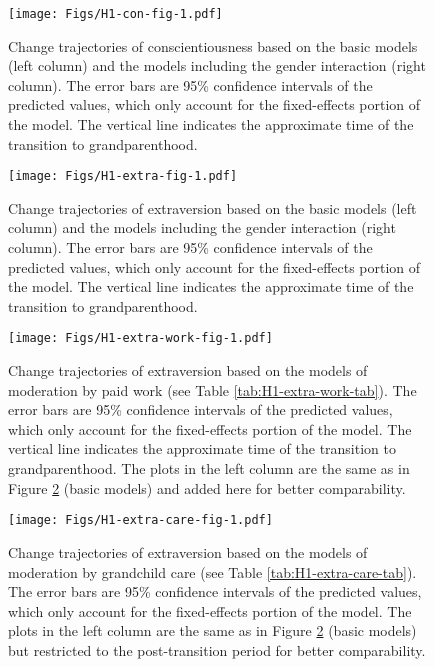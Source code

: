 \documentclass[
  english,
  man,floatsintext]{apa7}
\begin{document}
\begin{figure}
\centering
\texttt{[image: Figs/H1-con-fig-1.pdf]}
\caption{\label{fig:H1-con-fig}Change trajectories of conscientiousness based on the basic models (left column) and the models including the gender interaction (right column). The error bars are 95\% confidence intervals of the predicted values, which only account for the fixed-effects portion of the model. The vertical line indicates the approximate time of the transition to grandparenthood.}
\end{figure}



\begin{figure}
\centering
\texttt{[image: Figs/H1-extra-fig-1.pdf]}
\caption{\label{fig:H1-extra-fig}Change trajectories of extraversion based on the basic models (left column) and the models including the gender interaction (right column). The error bars are 95\% confidence intervals of the predicted values, which only account for the fixed-effects portion of the model. The vertical line indicates the approximate time of the transition to grandparenthood.}
\end{figure}



\begin{figure}
\centering
\texttt{[image: Figs/H1-extra-work-fig-1.pdf]}
\caption{\label{fig:H1-extra-work-fig}Change trajectories of extraversion based on the models of moderation by paid work (see Table \ref{tab:H1-extra-work-tab}). The error bars are 95\% confidence intervals of the predicted values, which only account for the fixed-effects portion of the model. The vertical line indicates the approximate time of the transition to grandparenthood. The plots in the left column are the same as in Figure \ref{fig:H1-extra-fig} (basic models) and added here for better comparability.}
\end{figure}



\begin{figure}
\centering
\texttt{[image: Figs/H1-extra-care-fig-1.pdf]}
\caption{\label{fig:H1-extra-care-fig}Change trajectories of extraversion based on the models of moderation by grandchild care (see Table \ref{tab:H1-extra-care-tab}). The error bars are 95\% confidence intervals of the predicted values, which only account for the fixed-effects portion of the model. The plots in the left column are the same as in Figure \ref{fig:H1-extra-fig} (basic models) but restricted to the post-transition period for better comparability.}
\end{figure}
\end{document}

